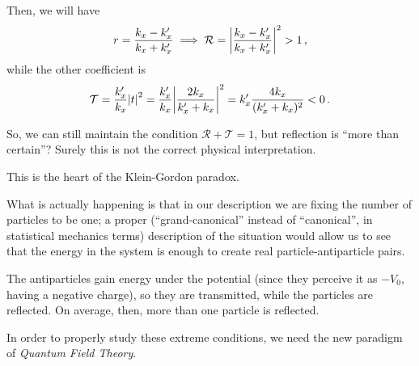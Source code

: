 \documentclass[main.tex]{subfiles}
\begin{document}
Then, we will have 
%
\begin{align}
r = \frac{k_x - k_x^{\prime }}{k_x + k_x^{\prime }} 
\implies 
\mathcal{R} = \abs{\frac{k_x - k_x^{\prime }}{k_x + k_x^{\prime }}}^2 > 1
\,,
\end{align}
%
while the other coefficient is 
%
\begin{align}
\mathcal{T} = \frac{k_x^{\prime }}{k_x} \abs{t}^2  
= \frac{k_x^{\prime }}{k_x} \abs{\frac{2 k_x}{k_x^{\prime } + k_x}}^2 
= k_x^{\prime } \frac{4 k_x}{(k_x^{\prime } + k_x)^2}
< 0
\,.
\end{align}
%

So, we can still maintain the condition \(\mathcal{R} + \mathcal{T} =1\), but reflection is ``more than certain''? Surely this is not the correct physical interpretation. 

This is the heart of the Klein-Gordon paradox. 

What is actually happening is that in our description we are fixing the number of particles to be one; a proper (``grand-canonical'' instead of ``canonical'', in statistical mechanics terms) description of the situation would allow us to see that the energy in the system is enough to create real particle-antiparticle pairs.

The antiparticles gain energy under the potential (since they perceive it as \(-V_0 \), having a negative charge), so they are transmitted, while the particles are reflected. On average, then, more than one particle is reflected. 

In order to properly study these extreme conditions, we need the new paradigm of \emph{Quantum Field Theory}. 
\end{document}
